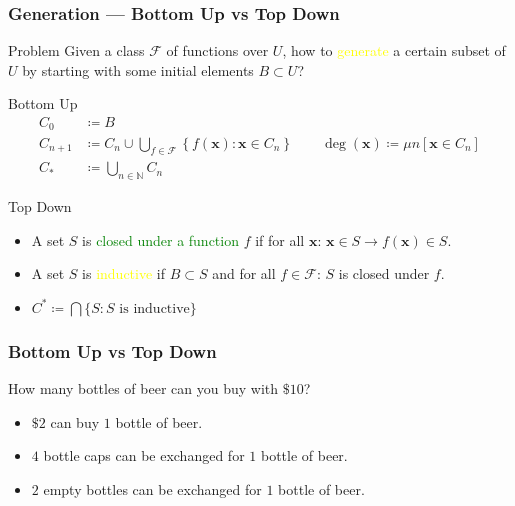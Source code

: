 \documentclass[UTF8,aspectratio=43,11pt,colorlinks,compress,openany]{beamer}%
\begin{document}
\begin{frame}\frametitle{Generation --- Bottom Up vs Top Down}
\setlength\abovedisplayskip{0pt}
\setlength\belowdisplayskip{0pt}
	\begin{block}{Problem}
		Given a class $\mathcal{F}$ of functions over $U$, how to \textcolor{yellow}{generate} a certain subset of $U$ by starting with some initial elements $B\subset U$?
	\end{block}
			\begin{block}{Bottom Up}\vspace{-4pt}
				\begin{align*}
				C_0&\coloneqq B\\ C_{n+1}&\coloneqq C_n\cup\bigcup\limits_{f\in\mathcal{F}}\left\{f(\mathbf{x}): \mathbf{x}\in C_n\right\}\qquad\operatorname{deg}(\mathbf{x})\coloneqq \mu n\left[\mathbf{x}\in C_n\right]\\
				C_*&\coloneqq \bigcup\limits_{n\in\mathbb{N}} C_n
				\end{align*}
			\end{block}
			\begin{block}{Top Down}
				\begin{itemize}
					\item A set $S$ is \textcolor{green}{closed under a function} $f$ if for all $\mathbf{x}$: $\mathbf{x}\in S\to f(\mathbf{x})\in S$.
					\item A set $S$ is \textcolor{yellow}{inductive} if $B\subset S$ and for all $f\in\mathcal{F}$: $S$ is closed under $f$.
					\item $C^*\coloneqq \bigcap\{S: S\mbox{ is inductive}\}$
				\end{itemize}
			\end{block}
\end{frame}

\begin{frame}\frametitle{Bottom Up vs Top Down}
	\begin{block}{How many bottles of beer can you buy with $\$10$?}
		\begin{itemize}
		\item $\$2$ can buy $1$ bottle of beer.
		\item $4$ bottle caps can be exchanged for $1$ bottle of beer.
		\item $2$ empty bottles can be exchanged for $1$ bottle of beer.
		\end{itemize}
	\end{block}
\end{frame}
\end{document}
